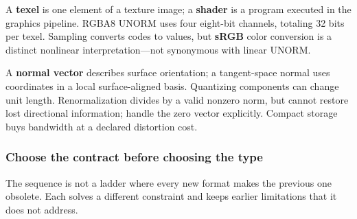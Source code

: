 A \textbf{texel} is one element of a texture image; a \textbf{shader} is a program executed in the graphics pipeline. RGBA8 UNORM uses four eight-bit channels, totaling 32 bits per texel. Sampling converts codes to values, but \textbf{sRGB} color conversion is a distinct nonlinear interpretation---not synonymous with linear UNORM.

A \textbf{normal vector} describes surface orientation; a tangent-space normal uses coordinates in a local surface-aligned basis. Quantizing components can change unit length. Renormalization divides by a valid nonzero norm, but cannot restore lost directional information; handle the zero vector explicitly. Compact storage buys bandwidth at a declared distortion cost.

\subsubsection{Choose the contract before choosing the type}\label{01-foundations-i-ch001-choose-the-contract-before-choosing-the-type}

\hypertarget{01-foundations-i-ch001-choose-the-contract-before-choosing-the-type}{}

The sequence is not a ladder where every new format makes the previous one obsolete. Each solves a different constraint and keeps earlier limitations that it does not address.

